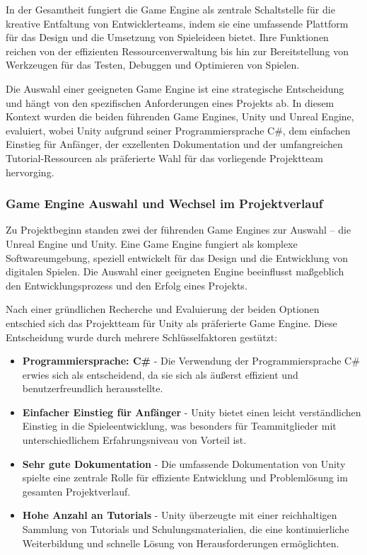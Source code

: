 In der Gesamtheit fungiert die Game Engine als zentrale Schaltstelle für die kreative Entfaltung von Entwicklerteams,
indem sie eine umfassende Plattform für das Design und die Umsetzung von Spieleideen bietet. Ihre Funktionen reichen
von der effizienten Ressourcenverwaltung bis hin zur Bereitstellung von Werkzeugen für das Testen, Debuggen und
Optimieren von Spielen.

Die Auswahl einer geeigneten Game Engine ist eine strategische Entscheidung und hängt von den spezifischen
Anforderungen eines Projekts ab. In diesem Kontext wurden die beiden führenden Game Engines, Unity und Unreal Engine,
evaluiert, wobei Unity aufgrund seiner Programmiersprache C#, dem einfachen Einstieg für Anfänger, der exzellenten
Dokumentation und der umfangreichen Tutorial-Ressourcen als präferierte Wahl für das vorliegende Projektteam hervorging.

\subsubsection{Game Engine Auswahl und Wechsel im Projektverlauf}
Zu Projektbeginn standen zwei der führenden Game Engines zur Auswahl – die Unreal Engine und Unity. Eine Game Engine
fungiert als komplexe Softwareumgebung, speziell entwickelt für das Design und die Entwicklung von digitalen Spielen.
Die Auswahl einer geeigneten Engine beeinflusst maßgeblich den Entwicklungsprozess und den Erfolg eines Projekts.

Nach einer gründlichen Recherche und Evaluierung der beiden Optionen entschied sich das Projektteam für Unity als
präferierte Game Engine. Diese Entscheidung wurde durch mehrere Schlüsselfaktoren gestützt:

\begin{itemize}
    \item \textbf{Programmiersprache: C#} - Die Verwendung der Programmiersprache C# erwies sich als entscheidend,
    da sie sich als äußerst effizient und benutzerfreundlich herausstellte.
    \item \textbf{Einfacher Einstieg für Anfänger} - Unity bietet einen leicht verständlichen Einstieg in die
    Spieleentwicklung, was besonders für Teammitglieder mit unterschiedlichem Erfahrungsniveau von Vorteil ist.
    \item \textbf{Sehr gute Dokumentation} - Die umfassende Dokumentation von Unity spielte eine zentrale Rolle für
    effiziente Entwicklung und Problemlösung im gesamten Projektverlauf.
    \item \textbf{Hohe Anzahl an Tutorials} - Unity überzeugte mit einer reichhaltigen Sammlung von Tutorials und
    Schulungsmaterialien, die eine kontinuierliche Weiterbildung und schnelle Lösung von Herausforderungen ermöglichten.
\end{itemize}

